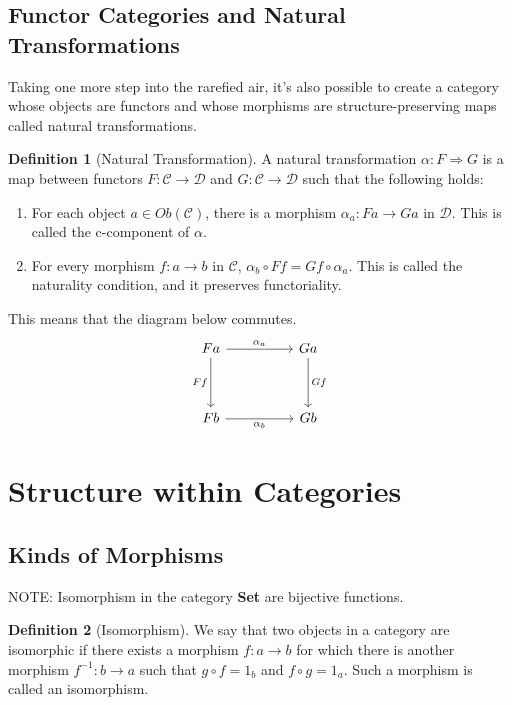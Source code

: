 \documentclass{article}
\theoremstyle{definition}
\newtheorem{definition}{Definition}
\begin{document}
\subsection*{Functor Categories and Natural Transformations}
Taking one more step into the rarefied air, it's also possible to create a category whose objects are functors and whose morphisms are structure-preserving maps called natural transformations.
\begin{definition}[Natural Transformation]
    A natural transformation $\alpha :F\Rightarrow G$ is a map between functors $F:\mathcal{C}\rightarrow\mathcal{D}$ and $G:\mathcal{C}\rightarrow\mathcal{D}$ such that the following holds:
    \begin{enumerate}
        \item For each object $a \in Ob(\mathcal{C})$, there is a morphism $\alpha_a:Fa\rightarrow Ga$ in $\mathcal{D}$. This is called the c-component of $\alpha$.
        \item For every morphism $f:a\rightarrow b$ in $\mathcal{C}$, $\alpha_b\circ Ff=Gf\circ\alpha_a$. This is called the naturality condition, and it preserves functoriality.
    \end{enumerate}
    \color{blue}
    This means that the diagram below commutes.
    \[\begin{tikzcd}
            Fa && Ga \\
            \\
            Fb && Gb
            \arrow["{\alpha_b}"', from=3-1, to=3-3]
            \arrow["Gf", from=1-3, to=3-3]
            \arrow["Ff"', from=1-1, to=3-1]
            \arrow["{\alpha_a}", from=1-1, to=1-3]
        \end{tikzcd}\]
    \color{black}
\end{definition}

\section*{Structure within Categories}
\subsection*{Kinds of Morphisms}

NOTE: Isomorphism in the category \textbf{Set} are bijective functions.
\begin{definition}[Isomorphism]
    We say that two objects in a category are isomorphic if there exists a morphism $f:a\rightarrow b$ for which there is another morphism $f^{-1}:b\rightarrow a$ such that $g\circ f=1_b$ and $f\circ g=1_a$.
    Such a morphism is called an isomorphism.
\end{definition}
\end{document}
